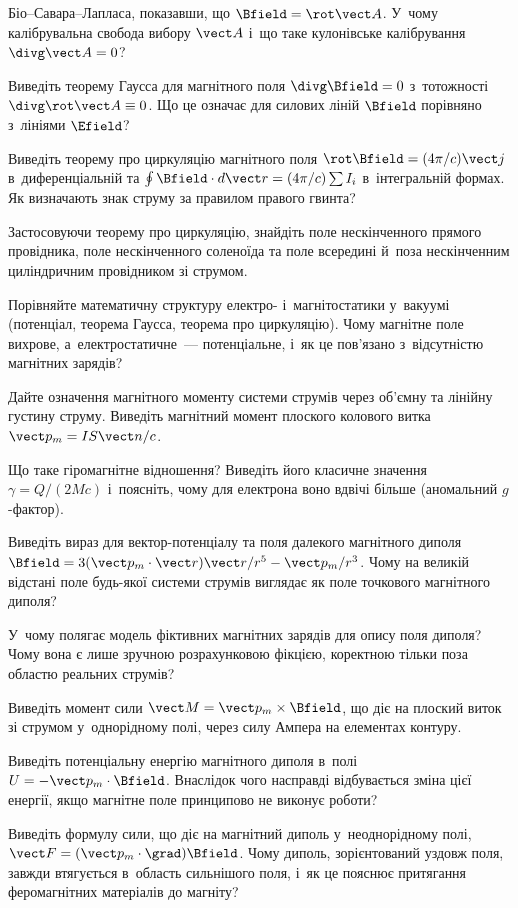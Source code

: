 \begin{Questions}
\begin{quizlist}
		Біо--Савара--Лапласа, показавши, що $\Bfield=\rot\vect A$. У~чому калібрувальна
		свобода вибору $\vect A$ і~що таке кулонівське калібрування $\divg\vect A=0$?
		\item Виведіть теорему Гаусса для магнітного поля $\divg\Bfield=0$ з~тотожності
		$\divg\rot\vect A\equiv0$. Що це означає для силових ліній $\Bfield$ порівняно
		з~лініями $\Efield$?
		\item Виведіть теорему про циркуляцію магнітного поля $\rot\Bfield = (4\pi/c)\vect j$
		в~диференціальній та $\oint\Bfield\cdot d\vect r = (4\pi/c)\sum I_i$ в~інтегральній
		формах. Як визначають знак струму за правилом правого гвинта?
		\item Застосовуючи теорему про циркуляцію, знайдіть поле нескінченного прямого
		провідника, поле нескінченного соленоїда та поле всередині й~поза нескінченним
		циліндричним провідником зі струмом.
		\item Порівняйте математичну структуру електро- і~магнітостатики у~вакуумі (потенціал,
		теорема Гаусса, теорема про циркуляцію). Чому магнітне поле вихрове,
		а~електростатичне~--- потенціальне, і~як це пов'язано з~відсутністю магнітних
		зарядів?
		\item Дайте означення магнітного моменту системи струмів через об'ємну та лінійну
		густину струму. Виведіть магнітний момент плоского колового витка $\vect p_m =
			IS\vect n/c$.
		\item Що таке гіромагнітне відношення? Виведіть його класичне значення $\gamma =
			Q/(2Mc)$ і~поясніть, чому для електрона воно вдвічі більше (аномальний
		$g$-фактор).
		\item Виведіть вираз для вектор-потенціалу та поля далекого магнітного диполя $\Bfield
			= 3(\vect p_m\cdot\vect r)\vect r/r^5 - \vect p_m/r^3$. Чому на великій відстані
		поле будь-якої системи струмів виглядає як поле точкового магнітного диполя?
		\item У~чому полягає модель фіктивних магнітних зарядів для опису поля диполя? Чому
		вона є лише зручною розрахунковою фікцією, коректною тільки поза областю реальних
		струмів?
		\item Виведіть момент сили $\vect M = \vect p_m\times\Bfield$, що діє на плоский виток
		зі струмом у~однорідному полі, через силу Ампера на елементах контуру.
		\item Виведіть потенціальну енергію магнітного диполя в~полі $U=-\vect
			p_m\cdot\Bfield$. Внаслідок чого насправді відбувається зміна цієї енергії, якщо
		магнітне поле принципово не виконує роботи?
		\item Виведіть формулу сили, що діє на магнітний диполь у~неоднорідному полі, $\vect F
			= (\vect p_m\cdot\grad)\Bfield$. Чому диполь, зорієнтований уздовж поля, завжди
		втягується в~область сильнішого поля, і~як це пояснює притягання феромагнітних
		матеріалів до магніту?
	\end{quizlist}
\end{Questions}

